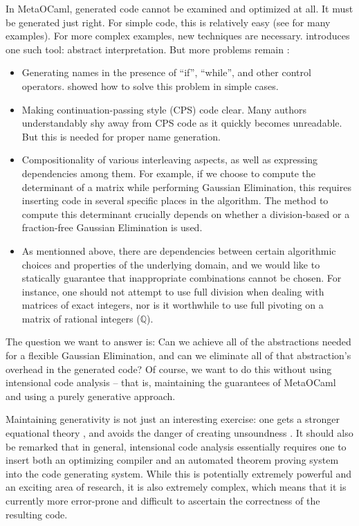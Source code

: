 \documentclass{llncs}
\begin{document}
In MetaOCaml, generated code cannot be examined and optimized at all. It must
be generated just right.  For simple code, this is relatively easy
(see \cite{TahaThesis} for many examples).  For more complex examples,
new techniques are necessary.  \cite{KiselyovTaha} introduces one
such tool: abstract interpretation.  But more problems remain
\cite{Padua:MetaOcaml:04}:
\begin{itemize}
    \item Generating names in the presence of ``if'', ``while'', and other
        control operators. \cite{KiselyovTaha} showed how to solve
        this problem in simple cases.
    \item Making continuation-passing style (CPS) code clear.  Many
        authors understandably shy away from CPS code as it quickly
        becomes unreadable.  But this is needed for proper name
        generation.
    \item Compositionality of various interleaving aspects, as well
        as expressing dependencies among them.  For example, if we
        choose to compute the determinant of a matrix while performing
        Gaussian Elimination, this requires inserting code in 
        several specific places in the algorithm.  The method to
        compute this determinant crucially depends on whether 
        a division-based or a fraction-free Gaussian Elimination is
        used.
    \item As mentionned above, there are dependencies between
        certain algorithmic choices and properties of the
        underlying domain, and we would like to statically guarantee
        that inappropriate combinations cannot be chosen.  For instance,
        one should not attempt to use full division when dealing
        with matrices of exact integers, nor is it worthwhile to use
        full pivoting on a matrix of rational integers ($\mathbb Q $).
\end{itemize}
The question we want to answer is:
Can we achieve all of the abstractions needed for a flexible 
Gaussian Elimination, and can
we eliminate all of that abstraction's overhead in the generated code?
Of course, we want to do this without using
intensional code analysis -- that is, maintaining the
guarantees of MetaOCaml and using a purely generative approach.

Maintaining generativity is not just an interesting exercise:
one gets a stronger equational theory \cite{Taha2000}, and avoids
the danger of creating unsoundness \cite{TahaThesis}.  It should
also be remarked that in general, intensional code analysis
\cite{Pueschel:05,Kennedy01Telescoping,dongarra7,Veldhuizen:2004} 
essentially requires
one to insert both an optimizing compiler and an automated theorem
proving system into the code generating system.  While this is
potentially extremely powerful and an exciting area of research,
it is also extremely complex, which means that it is currently more
error-prone and difficult to ascertain the correctness of the 
resulting code.
\end{document}

